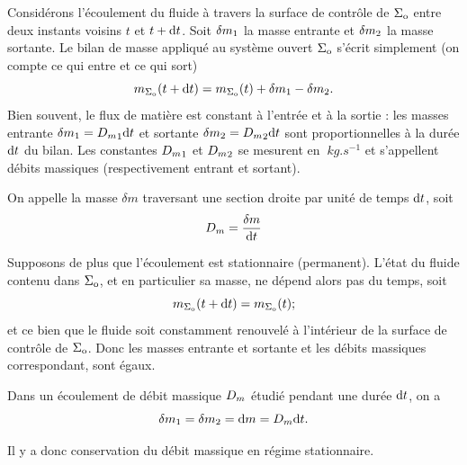 \documentclass[12pt,fancy]{cours}
\begin{document}
Considérons l'écoulement du fluide à travers la surface de contrôle de $\Sigma_{\rm o}$ entre deux instants voisins $t$ et $t + \mathrm{d} t$. Soit  $\delta m_{\rm 1}$ la masse entrante et $\delta m_{\rm 2}$ la masse sortante. Le bilan de masse appliqué au système ouvert $\Sigma_{\rm o}$ s’écrit simplement (on compte ce qui entre et ce qui sort) \begin{equation}
m_{\Sigma_{\rm{o}}}(t+\mathrm{d} t) = m_{\Sigma_{\rm{o}}}(t)+\delta m_{\rm 1} - \delta m_{\rm 2}.
\end{equation}
Bien souvent, le flux de matière est constant à l'entrée et à la sortie : les masses entrante $\delta m_{\rm 1} = {D_m}_1\mathrm{d} t$ et sortante $\delta m_{\rm 2} = {D_m}_2 \mathrm{d} t$ sont proportionnelles à la durée $\mathrm{d} t$ du bilan. Les constantes ${D_m}_1$ et ${D_m}_2$ se mesurent en $\SI{}{kg.s^{-1}}$ et s'appellent débits massiques (respectivement entrant et sortant).

\begin{definition}
On appelle  la masse $\delta m$ traversant une section droite par unité de temps $\mathrm{d} t$, soit
$$
D_m = \frac{\delta m}{\mathrm{d} t}
$$
\end{definition}

 Supposons de plus que l'écoulement est stationnaire (permanent). L'état du fluide contenu dans $\Sigma_{\rm o}$, et en particulier sa masse, ne dépend alors pas du temps, soit
\begin{equation}
m_{\Sigma_{\rm{o}}}(t+\mathrm{d} t) = m_{\Sigma_{\rm{o}}}(t) ;
\end{equation}
et ce bien que le fluide  soit constamment renouvelé à l'intérieur de la surface de contrôle de $\Sigma_{\rm o}$. Donc les masses entrante et sortante et les débits massiques correspondant, sont égaux.


\begin{prop}\label{prop:}
Dans un écoulement  de débit massique $D_m$ étudié pendant une durée $\mathrm{d} t$,  on a
\begin{equation*}
\delta m_{\rm 1} = \delta m_{\rm 2} = \mathrm{d} m = D_m \mathrm{d} t.
\end{equation*}
\end{prop}
\noindent Il y a donc conservation du débit massique en régime stationnaire.
\end{document}
